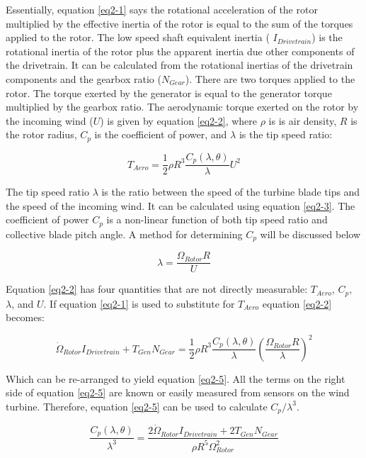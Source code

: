 Essentially, equation  \ref{eq2-1} says the rotational acceleration of the rotor multiplied by the effective inertia of the rotor is equal to the sum of the torques applied to the rotor. The low speed shaft equivalent inertia ( $I_{Drivetrain}$) is the rotational inertia of the rotor plus the apparent inertia due other components of the drivetrain. It can be calculated from the rotational inertias of the drivetrain components and the gearbox ratio ($N_{Gear}$). There are two torques applied to the rotor. The torque exerted by the generator is equal to the generator torque multiplied by the gearbox ratio. The aerodynamic torque exerted on the rotor by the incoming wind ($U$) is given by equation \ref{eq2-2}, where $\rho$ is is air density, $R$ is the rotor radius, $C_p$ is the coefficient of power, and $\lambda$ is the tip speed ratio:

\begin{equation}
	T_{Aero}=\frac{1}{2}\rho R^{3}\frac{C_{p}(\lambda,\theta)}{\lambda}U^{2} \label{eq2-2}
\end{equation}

The tip speed ratio $\lambda$ is the ratio between the speed of the turbine blade tips and the speed of the incoming wind. It can be calculated using equation \ref{eq2-3}. The coefficient of power $C_p$ is a non-linear function of both tip speed ratio and collective blade pitch angle. A method for determining $C_p$ will be discussed below

\begin{equation}
	\lambda=\frac{\Omega_{Rotor} R}{U} \label{eq2-3}
\end{equation}

Equation \ref{eq2-2} has four quantities that are not directly measurable: $T_{Aero}$, $C_p,$ $\lambda$, and $U$. If equation \ref{eq2-1} is used to substitute for $T_{Aero}$ equation \ref{eq2-2} becomes:

\begin{equation}
	\dot{\Omega }_{Rotor} I_{Drivetrain} + T_{Gen} N_{Gear} = \frac{1}{2} \rho R^3 \frac{C_p ( \lambda , \theta )}{\lambda} \left(\frac{\Omega_{Rotor} R}{\lambda}\right)^2   \label{eq2-4}
\end{equation}

Which can be re-arranged to yield equation \ref{eq2-5}. All the terms on the right side of equation \ref{eq2-5} are known or easily measured from sensors on the wind turbine. Therefore, equation \ref{eq2-5} can be used to calculate $C_p / \lambda^3$.

\begin{equation}
	 \frac{C_p ( \lambda, \theta)}{\lambda^3} = \frac{2 \dot{\Omega}_{Rotor} I_{Drivetrain} + 2 T_{Gen} N_{Gear}}{\rho R^5 \Omega^2_{Rotor}} \label{eq2-5}
\end{equation}


